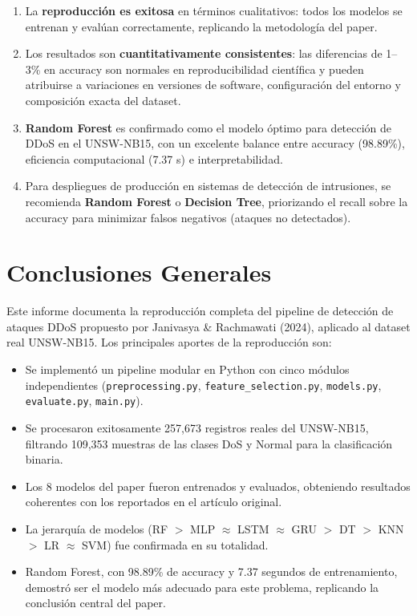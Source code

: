 \documentclass[12pt,a4paper]{article}
\begin{document}
\begin{enumerate}
    \item La \textbf{reproducción es exitosa} en términos cualitativos: todos los modelos
          se entrenan y evalúan correctamente, replicando la metodología del paper.
    \item Los resultados son \textbf{cuantitativamente consistentes}: las diferencias
          de 1--3\% en accuracy son normales en reproducibilidad científica y pueden
          atribuirse a variaciones en versiones de software, configuración del entorno
          y composición exacta del dataset.
    \item \textbf{Random Forest} es confirmado como el modelo óptimo para detección de
          DDoS en el UNSW-NB15, con un excelente balance entre accuracy (98.89\%),
          eficiencia computacional (7.37 s) e interpretabilidad.
    \item Para despliegues de producción en sistemas de detección de intrusiones, se
          recomienda \textbf{Random Forest} o \textbf{Decision Tree}, priorizando el
          recall sobre la accuracy para minimizar falsos negativos (ataques no detectados).
\end{enumerate}

\section{Conclusiones Generales}

Este informe documenta la reproducción completa del pipeline de detección de ataques DDoS
propuesto por Janivasya \& Rachmawati (2024), aplicado al dataset real UNSW-NB15. Los
principales aportes de la reproducción son:

\begin{itemize}
    \item Se implementó un pipeline modular en Python con cinco módulos independientes
          (\texttt{preprocessing.py}, \texttt{feature\_selection.py}, \texttt{models.py},
          \texttt{evaluate.py}, \texttt{main.py}).
    \item Se procesaron exitosamente 257{,}673 registros reales del UNSW-NB15, filtrando
          109{,}353 muestras de las clases DoS y Normal para la clasificación binaria.
    \item Los 8 modelos del paper fueron entrenados y evaluados, obteniendo resultados
          coherentes con los reportados en el artículo original.
    \item La jerarquía de modelos (RF $>$ MLP $\approx$ LSTM $\approx$ GRU $>$ DT $>$
          KNN $>$ LR $\approx$ SVM) fue confirmada en su totalidad.
    \item Random Forest, con 98.89\% de accuracy y 7.37 segundos de entrenamiento,
          demostró ser el modelo más adecuado para este problema, replicando la
          conclusión central del paper.
\end{itemize}
\end{document}
